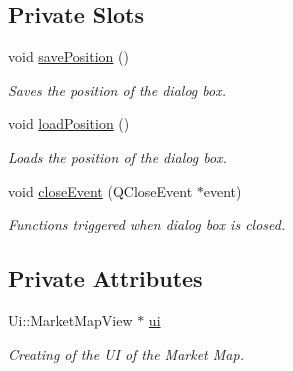 \subsection*{Private Slots}
\begin{DoxyCompactItemize}
\item 
\hypertarget{class_market_map_view_ae680dd9e4cffd99085ce9d0aecaebd0c}{void \hyperlink{class_market_map_view_ae680dd9e4cffd99085ce9d0aecaebd0c}{save\+Position} ()}\label{class_market_map_view_ae680dd9e4cffd99085ce9d0aecaebd0c}

\begin{DoxyCompactList}\small\item\em Saves the position of the dialog box. \end{DoxyCompactList}\item 
\hypertarget{class_market_map_view_a5bf3380427a2fca3737acff9c0e82bf2}{void \hyperlink{class_market_map_view_a5bf3380427a2fca3737acff9c0e82bf2}{load\+Position} ()}\label{class_market_map_view_a5bf3380427a2fca3737acff9c0e82bf2}

\begin{DoxyCompactList}\small\item\em Loads the position of the dialog box. \end{DoxyCompactList}\item 
\hypertarget{class_market_map_view_aeb74298240bbc6d4af02e06c3cc8aa79}{void \hyperlink{class_market_map_view_aeb74298240bbc6d4af02e06c3cc8aa79}{close\+Event} (Q\+Close\+Event $\ast$event)}\label{class_market_map_view_aeb74298240bbc6d4af02e06c3cc8aa79}

\begin{DoxyCompactList}\small\item\em Functions triggered when dialog box is closed. \end{DoxyCompactList}\end{DoxyCompactItemize}
\subsection*{Private Attributes}
\begin{DoxyCompactItemize}
\item 
\hypertarget{class_market_map_view_ad147de5cb234034d0140aa3ba132d49b}{Ui\+::\+Market\+Map\+View $\ast$ \hyperlink{class_market_map_view_ad147de5cb234034d0140aa3ba132d49b}{ui}}\label{class_market_map_view_ad147de5cb234034d0140aa3ba132d49b}

\begin{DoxyCompactList}\small\item\em Creating of the U\+I of the Market Map. \end{DoxyCompactList}\end{DoxyCompactItemize}


